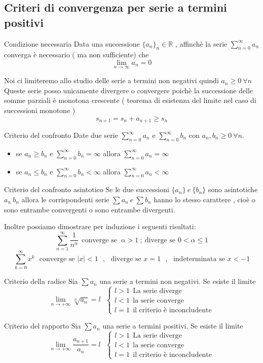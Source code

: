 \documentclass{article}
\theoremstyle{definition}
\newcommand{\R}{\mathbb{R}}
\begin{document}
\subsection{Criteri di convergenza per serie a termini positivi}
\begin{teo1*}{Condizione necessaria}{}
	Data una successione $\{a_n \}_n \in \R$ , affinchè la  serie $\sum_{n=0}^{\infty}a_n $ converga è necessario ( ma non sufficiente) che 
	$$\lim_{n\rightarrow \infty }a_n=0$$
\end{teo1*}
Noi ci limiteremo allo studio delle serie a termini non negativi quindi $a_n \geq 0 \ \forall n $\\
Queste serie posso unicamente divergere o convergere poichè la successione delle somme parziali è monotona crescente ( teorema di esistenza del limite nel caso di successioni monotone )
$$s_{n+1}=s_n+a_{n+1} \geq s_n $$
\begin{teo1*}{Criterio del confronto}{}
Date due serie  $\sum_{n=0}^{\infty}a_n $ e $\sum_{n=0}^{\infty}b_n $ con $a_n,b_n \geq 0 \ \forall n$.
\begin{itemize}
	\item se $a_n \geq b_n$ e $\sum_{n=0}^{\infty}b_n=\infty $ allora $\sum_{n=0}^{\infty}a_n= \infty$
	\item se $a_n \leq b_n$ e $\sum_{n=0}^{\infty}b_n < \infty$ allora $\sum_{n=0}^{\infty}a_n < \infty $ 
\end{itemize}
\end{teo1*}
\begin{teo1*}{Criterio del confronto asintotico}
	Se le due successioni $\{a_n\} \ e \ \{b_n\}$  sono asintotiche $a_n ~ b_n$ allora le corrispondenti serie $\sum a_n \ e \ \sum b_n $ hanno lo stesso carattere , cioè o sono entrambe convergenti o sono entrambe divergenti. 
\end{teo1*}
Inoltre possiamo dimostrare per induzione i seguenti risultati:
$$\sum_{n=1}^{\infty}\frac{1}{n^{\alpha}} \ \ \text{converge se } \ \alpha > 1 \ ; \ \text{diverge se } 0 < \alpha \leq 1 $$
$$\sum_{k=0}^{\infty}x^k \ \ \ \text{converge se } |x| < 1  \ \ \ , \ \ \ \text{diverge se } x=1 \ \ \ , \ \ \ \text{indeterminata se } x<-1$$ 
\begin{teo1*}{Criterio della radice }
 Sia $\sum a_n$ una serie a termini non negativi. Se esiste il limite 
 $$\lim_{n\rightarrow +\infty}\sqrt[n]{a_n}=l \ \ \  \begin{cases}
 	l > 1 \ \ \text{La serie diverge } \\ l< 1 \ \ \text{la serie converge} \\ l=1 \ \ \text{il criterio è inconcludente}
 \end{cases}$$
\end{teo1*}
\begin{teo1*}{Criterio del rapporto}
Sia $\sum a_n$ una serie a termini positivi. Se esiste il limite 
$$\lim_{n\rightarrow +\infty} \frac{a_{n+1}}{a_n}=l \ \ \  \begin{cases}
	l > 1 \ \ \text{La serie diverge } \\ l< 1 \ \ \text{la serie converge} \\ l=1 \ \ \text{il criterio è inconcludente}
\end{cases}$$
\end{teo1*}
\end{document}
